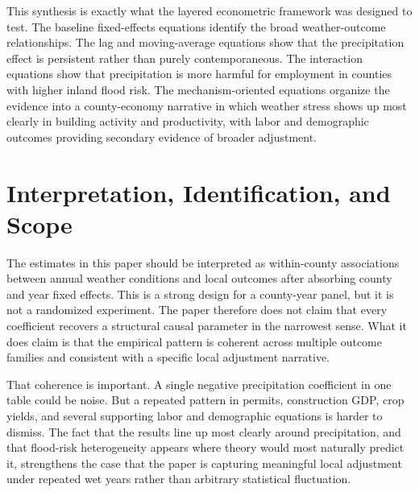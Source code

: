 \documentclass[12pt]{article}
\begin{document}
This synthesis is exactly what the layered econometric framework was designed to test. The baseline fixed-effects equations identify the broad weather-outcome relationships. The lag and moving-average equations show that the precipitation effect is persistent rather than purely contemporaneous. The interaction equations show that precipitation is more harmful for employment in counties with higher inland flood risk. The mechanism-oriented equations organize the evidence into a county-economy narrative in which weather stress shows up most clearly in building activity and productivity, with labor and demographic outcomes providing secondary evidence of broader adjustment.

\section{Interpretation, Identification, and Scope}

The estimates in this paper should be interpreted as within-county associations between annual weather conditions and local outcomes after absorbing county and year fixed effects. This is a strong design for a county-year panel, but it is not a randomized experiment. The paper therefore does not claim that every coefficient recovers a structural causal parameter in the narrowest sense. What it does claim is that the empirical pattern is coherent across multiple outcome families and consistent with a specific local adjustment narrative.

That coherence is important. A single negative precipitation coefficient in one table could be noise. But a repeated pattern in permits, construction GDP, crop yields, and several supporting labor and demographic equations is harder to dismiss. The fact that the results line up most clearly around precipitation, and that flood-risk heterogeneity appears where theory would most naturally predict it, strengthens the case that the paper is capturing meaningful local adjustment under repeated wet years rather than arbitrary statistical fluctuation.
\end{document}
